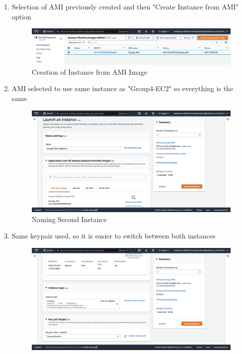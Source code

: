 \begin{enumerate}
	\item Selection of AMI previously created and then "Create Instance from AMI" option \begin{figure}[H]
	      \centering
	      \includegraphics[width=\textwidth]{resources/elb/elb-instance-from-ami.png}
	      \caption{Creation of Instance from AMI Image}
	      \label{fig:elb-instance-from-ami}
	\end{figure}
	\item AMI selected to use same instance as "Group4-EC2" so everything is the same \begin{figure}[H]
	      \centering
	      \includegraphics[width=\textwidth]{resources/elb/elb-instance-2-name.png}
	      \caption{Naming Second Instance}
	      \label{fig:elb-instance-2-name}
	\end{figure}
	\item Same keypair used, so it is easier to switch between both instances \begin{figure}[H]
	      \centering
	      \includegraphics[width=\textwidth]{resources/elb/elb-instance-2-type-and-keypair.png}

\end{figure}
\end{enumerate}
